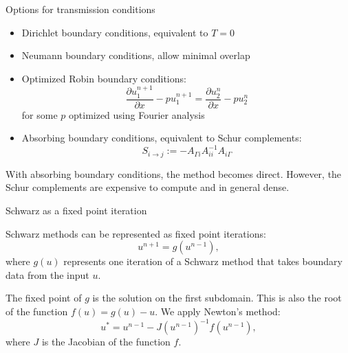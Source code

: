 \documentclass{beamer}
\begin{document}
\begin{frame}{Options for transmission conditions}

\begin{itemize}
\item Dirichlet boundary conditions, equivalent to $T=0$
\item Neumann boundary conditions, allow minimal overlap
\item Optimized Robin boundary conditions:
\begin{equation*}
	\frac{\partial u_1^{n+1}}{\partial x} - p u_1^{n+1} = \frac{\partial u_2^{n}}{\partial x} - p u_2^{n}
\end{equation*}
for some $p$ optimized using Fourier analysis
\item Absorbing boundary conditions, equivalent to Schur complements:
\begin{equation*}
	S_{i \to j} := -A_{\Gamma i} A_{ii}^{-1} A_{i \Gamma}
\end{equation*}
\end{itemize}
With absorbing boundary conditions, the method becomes direct.
However, the Schur complements are expensive to compute and in general dense.

\end{frame}

\begin{frame}{Schwarz as a fixed point iteration}

Schwarz methods can be represented as fixed point iterations:
\begin{equation*}
	u^{n+1} = g \left ( u^{n-1} \right ),
\end{equation*}
where $g(u)$ represents one iteration of a Schwarz method that takes boundary data from the input $u$.

The fixed point of $g$ is the solution on the first subdomain.
This is also the root of the function $f(u) = g(u) - u$.
We apply Newton's method:
\begin{equation*}
	u^* = u^{n-1} - J(u^{n-1})^{-1} f(u^{n-1}),
\end{equation*}
where $J$ is the Jacobian of the function $f$.
\end{frame}
\end{document}
